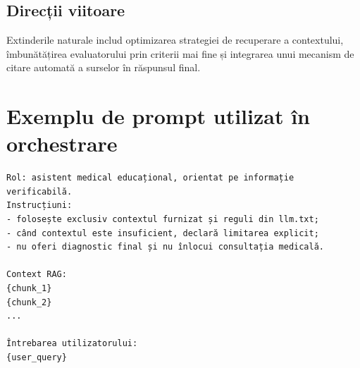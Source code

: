 \documentclass[12pt, a4paper, oneside, romanian]{teza-upb}
\begin{document}
\section{Direcții viitoare}
Extinderile naturale includ optimizarea strategiei de recuperare a contextului, îmbunătățirea evaluatorului prin criterii mai fine și integrarea unui mecanism de citare automată a surselor în răspunsul final.





\appendix
\chapter{Exemplu de prompt utilizat în orchestrare}
\begin{verbatim}
Rol: asistent medical educațional, orientat pe informație verificabilă.
Instrucțiuni:
- folosește exclusiv contextul furnizat și reguli din llm.txt;
- când contextul este insuficient, declară limitarea explicit;
- nu oferi diagnostic final și nu înlocui consultația medicală.

Context RAG:
{chunk_1}
{chunk_2}
...

Întrebarea utilizatorului:
{user_query}
\end{verbatim}
\end{document}
